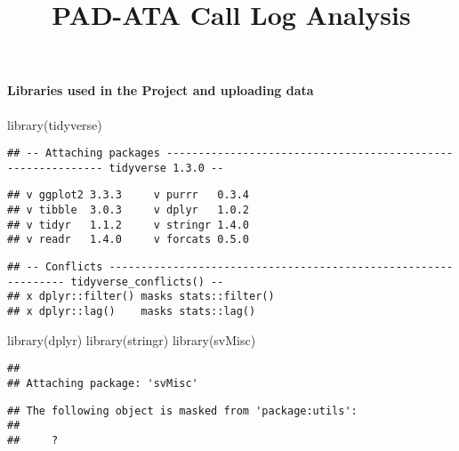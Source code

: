 \documentclass[
]{article}
\title{PAD-ATA Call Log Analysis}
\author{}
\date{\vspace{-2.5em}}
\newenvironment{Shaded}{\begin{snugshade}}{\end{snugshade}}
\newcommand{\FunctionTok}[1]{\textcolor[rgb]{0.00,0.00,0.00}{#1}}
\newcommand{\NormalTok}[1]{#1}
\begin{document}
\maketitle

\hypertarget{libraries-used-in-the-project-and-uploading-data}{%
\paragraph{Libraries used in the Project and uploading
data}\label{libraries-used-in-the-project-and-uploading-data}}

\begin{Shaded}
\begin{Highlighting}[]
\FunctionTok{library}\NormalTok{(tidyverse)}
\end{Highlighting}
\end{Shaded}

\begin{verbatim}
## -- Attaching packages ------------------------------------------------------------ tidyverse 1.3.0 --
\end{verbatim}

\begin{verbatim}
## v ggplot2 3.3.3     v purrr   0.3.4
## v tibble  3.0.3     v dplyr   1.0.2
## v tidyr   1.1.2     v stringr 1.4.0
## v readr   1.4.0     v forcats 0.5.0
\end{verbatim}

\begin{verbatim}
## -- Conflicts --------------------------------------------------------------- tidyverse_conflicts() --
## x dplyr::filter() masks stats::filter()
## x dplyr::lag()    masks stats::lag()
\end{verbatim}

\begin{Shaded}
\begin{Highlighting}[]
\FunctionTok{library}\NormalTok{(dplyr)}
\FunctionTok{library}\NormalTok{(stringr)}
\FunctionTok{library}\NormalTok{(svMisc)}
\end{Highlighting}
\end{Shaded}

\begin{verbatim}
## 
## Attaching package: 'svMisc'
\end{verbatim}

\begin{verbatim}
## The following object is masked from 'package:utils':
## 
##     ?
\end{verbatim}
\end{document}

